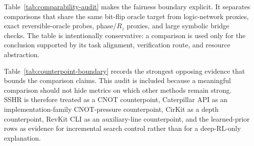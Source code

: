 \documentclass[11pt]{article}
\newcommand{\rz}{\ensuremath{R_z}}
\begin{document}
\begin{table}[H]
\centering
\scriptsize
\setlength{\tabcolsep}{2pt}
\renewcommand{\arraystretch}{1.05}
\caption{SSHR reproduction-scope audit.  The table records which SSHR-facing
elements are reproduced or source-anchored in the current package, and which
stronger SSHR claims remain outside the logical-layer submission.}
\label{tab:sshr-reproduction-scope}

\end{table}

Table~\ref{tab:comparability-audit} makes the fairness boundary explicit.  It
separates comparisons that share the same bit-flip oracle target from
logic-network proxies, exact reversible-oracle probes, phase/\rz{} proxies, and
large symbolic bridge checks.  The table is intentionally conservative: a
comparison is used only for the conclusion supported by its task alignment,
verification route, and resource abstraction.

\begin{table}[H]
\centering
\tiny
\setlength{\tabcolsep}{1.6pt}
\renewcommand{\arraystretch}{0.88}
\caption{Baseline comparability audit.  The table records why each comparison
family is fair enough for the paper's bounded claim, which controls are used,
and what residual abstraction mismatch remains.}
\label{tab:comparability-audit}

\end{table}

Table~\ref{tab:counterpoint-boundary} records the strongest opposing evidence
that bounds the comparison claims.  This audit is included because a meaningful
comparison should not hide metrics on which other methods remain strong.  SSHR
is therefore treated as a CNOT counterpoint, Caterpillar API as an
implementation-family CNOT-pressure counterpoint, CirKit as a depth
counterpoint, RevKit CLI as an auxiliary-line counterpoint, and the
learned-prior rows as evidence for incremental search control rather than for
a deep-RL-only explanation.

\begin{table}[H]
\centering
\scriptsize
\setlength{\tabcolsep}{2pt}
\renewcommand{\arraystretch}{1.05}
\caption{Counterpoint and claim-boundary audit.  The table reports the
strongest unfavorable metric evidence that constrains the manuscript's claims,
the favorable evidence that keeps each comparison meaningful, and the resulting
claim boundary.}
\label{tab:counterpoint-boundary}

\end{table}
\end{document}
